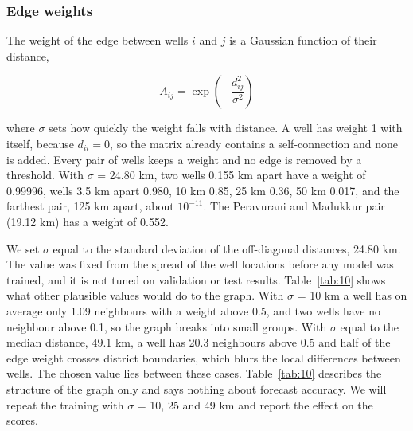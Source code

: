 \documentclass[conference]{IEEEtran}
\begin{document}
\subsubsection{Edge weights}

The weight of the edge between wells \(i\) and \(j\) is a Gaussian function of their distance,

\begin{equation}
A_{ij} = \exp\!\left(-\frac{d_{ij}^{2}}{\sigma^{2}}\right)\label{eq:10}
\end{equation}

where \(\sigma\) sets how quickly the weight falls with distance. A well has weight 1 with itself, because \(d_{ii} = 0\), so the matrix already contains a self-connection and none is added. Every pair of wells keeps a weight and no edge is removed by a threshold. With \(\sigma\) = 24.80 km, two wells 0.155 km apart have a weight of 0.99996, wells 3.5 km apart 0.980, 10 km 0.85, 25 km 0.36, 50 km 0.017, and the farthest pair, 125 km apart, about \(10^{-11}\). The Peravurani and Madukkur pair (19.12 km) has a weight of 0.552.

We set \(\sigma\) equal to the standard deviation of the off-diagonal distances, 24.80 km. The value was fixed from the spread of the well locations before any model was trained, and it is not tuned on validation or test results. Table~\ref{tab:10} shows what other plausible values would do to the graph. With \(\sigma\) = 10 km a well has on average only 1.09 neighbours with a weight above 0.5, and two wells have no neighbour above 0.1, so the graph breaks into small groups. With \(\sigma\) equal to the median distance, 49.1 km, a well has 20.3 neighbours above 0.5 and half of the edge weight crosses district boundaries, which blurs the local differences between wells. The chosen value lies between these cases. Table~\ref{tab:10} describes the structure of the graph only and says nothing about forecast accuracy. We will repeat the training with \(\sigma\) = 10, 25 and 49 km and report the effect on the scores.
\end{document}
